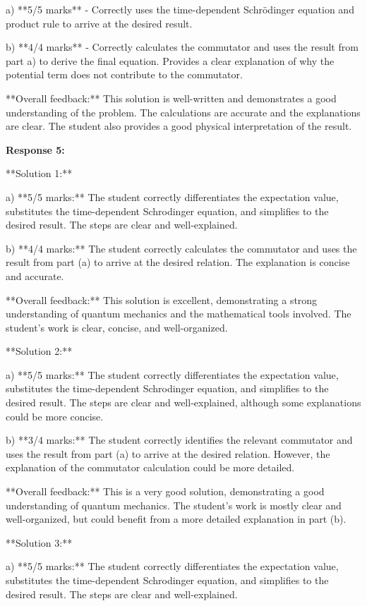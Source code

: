 \documentclass[a4paper,11pt]{article}
\begin{document}
a) **5/5 marks** - Correctly uses the time-dependent Schrödinger equation and product rule to arrive at the desired result.

b) **4/4 marks** - Correctly calculates the commutator and uses the result from part a) to derive the final equation. Provides a clear explanation of why the potential term does not contribute to the commutator.

**Overall feedback:** This solution is well-written and demonstrates a good understanding of the problem. The calculations are accurate and the explanations are clear. The student also provides a good physical interpretation of the result.


\textbf{Response 5:}

**Solution 1:**

a) **5/5 marks:** The student correctly differentiates the expectation value, substitutes the time-dependent Schrodinger equation, and simplifies to the desired result. The steps are clear and well-explained.

b) **4/4 marks:** The student correctly calculates the commutator and uses the result from part (a) to arrive at the desired relation. The explanation is concise and accurate.

**Overall feedback:** This solution is excellent, demonstrating a strong understanding of quantum mechanics and the mathematical tools involved. The student's work is clear, concise, and well-organized.

**Solution 2:**

a) **5/5 marks:** The student correctly differentiates the expectation value, substitutes the time-dependent Schrodinger equation, and simplifies to the desired result. The steps are clear and well-explained, although some explanations could be more concise.

b) **3/4 marks:** The student correctly identifies the relevant commutator and uses the result from part (a) to arrive at the desired relation. However, the explanation of the commutator calculation could be more detailed.

**Overall feedback:** This is a very good solution, demonstrating a good understanding of quantum mechanics. The student's work is mostly clear and well-organized, but could benefit from a more detailed explanation in part (b).

**Solution 3:**

a) **5/5 marks:** The student correctly differentiates the expectation value, substitutes the time-dependent Schrodinger equation, and simplifies to the desired result. The steps are clear and well-explained.
\end{document}
